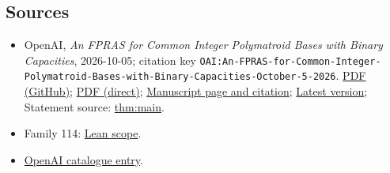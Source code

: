 \documentclass[11pt]{article}
\begin{document}
\subsection{Sources}
\begin{itemize}
\item OpenAI, \emph{An FPRAS for Common Integer Polymatroid Bases with Binary Capacities}, 2026-10-05; citation key \texttt{OAI:An-FPRAS-for-Common-Integer-Polymatroid-Bases-with-Binary-Capacities-October-5-2026}. \href{https://github.com/openai/math/blob/adc7f1241b42e322a6451854ab7e4b4c146bf78a/preprints/An-FPRAS-for-Common-Integer-Polymatroid-Bases-with-Binary-Capacities-October-5-2026/polymatroid-fpras.pdf}{PDF (GitHub)}; \href{https://github.com/openai/math/raw/adc7f1241b42e322a6451854ab7e4b4c146bf78a/preprints/An-FPRAS-for-Common-Integer-Polymatroid-Bases-with-Binary-Capacities-October-5-2026/polymatroid-fpras.pdf}{PDF (direct)}; \href{https://github.com/openai/math/blob/adc7f1241b42e322a6451854ab7e4b4c146bf78a/preprints/An-FPRAS-for-Common-Integer-Polymatroid-Bases-with-Binary-Capacities-October-5-2026/README.md}{Manuscript page and citation}; \href{https://github.com/openai/math/blob/main/preprints/An-FPRAS-for-Common-Integer-Polymatroid-Bases-with-Binary-Capacities-October-5-2026/polymatroid-fpras.pdf}{Latest version}; Statement source: \href{https://github.com/openai/math/blob/adc7f1241b42e322a6451854ab7e4b4c146bf78a/preprints/An-FPRAS-for-Common-Integer-Polymatroid-Bases-with-Binary-Capacities-October-5-2026/build/sections/introduction.tex\#L52}{thm:main}.
\item Family 114: \href{https://github.com/openai/math/blob/adc7f1241b42e322a6451854ab7e4b4c146bf78a/lean/docs/114.md}{Lean scope}.
\item \href{https://github.com/openai/math/blob/adc7f1241b42e322a6451854ab7e4b4c146bf78a/CONTENTS.md}{OpenAI catalogue entry}.
\end{itemize}
\end{document}
